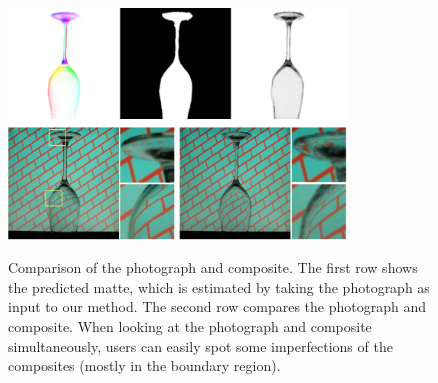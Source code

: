 \begin{table}[tbp] \centering
    \caption[User study results]{User study results. P, C, and N are short for votes for photograph, composite, and not distinguishable.}
    \large
    \label{tab:user_study}
\end{table}

\begin{figure}[htbp] \centering
    \includegraphics[width=0.8\textwidth]{ch-tomnet/images/user_study/user_study_larger} \\
    \caption[Comparison of the photograph and composite]{Comparison of the photograph and composite. The first row shows the predicted matte, which is estimated by taking the photograph as input to our method. The second row compares the photograph and composite. When looking at the photograph and composite simultaneously, users can easily spot some imperfections of the composites (mostly in the boundary region).}
    \label{fig:sup_user_study}
\end{figure}

